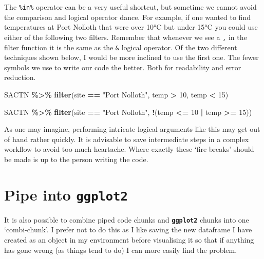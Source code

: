 \documentclass[
]{book}
\newenvironment{Shaded}{\begin{snugshade}}{\end{snugshade}}
\newcommand{\DecValTok}[1]{\textcolor[rgb]{0.00,0.00,0.81}{#1}}
\newcommand{\KeywordTok}[1]{\textcolor[rgb]{0.13,0.29,0.53}{\textbf{#1}}}
\newcommand{\NormalTok}[1]{#1}
\newcommand{\OperatorTok}[1]{\textcolor[rgb]{0.81,0.36,0.00}{\textbf{#1}}}
\newcommand{\StringTok}[1]{\textcolor[rgb]{0.31,0.60,0.02}{#1}}
\begin{document}
The \texttt{\%in\%} operator can be a very useful shortcut, but sometime we cannot avoid the comparison and logical operator dance. For example, if one wanted to find temperatures at Port Nolloth that were over 10°C but under 15°C you could use either of the following two filters. Remember that whenever we see a \texttt{,} in the filter function it is the same as the \texttt{\&} logical operator. Of the two different techniques shown below, I would be more inclined to use the first one. The fewer symbols we use to write our code the better. Both for readability and error reduction.

\begin{Shaded}
\begin{Highlighting}[]
\NormalTok{SACTN }\OperatorTok{\%>\%}\StringTok{ }
\StringTok{  }\KeywordTok{filter}\NormalTok{(site }\OperatorTok{==}\StringTok{ "Port Nolloth"}\NormalTok{, temp }\OperatorTok{>}\StringTok{ }\DecValTok{10}\NormalTok{, temp }\OperatorTok{<}\StringTok{ }\DecValTok{15}\NormalTok{)}

\NormalTok{SACTN }\OperatorTok{\%>\%}\StringTok{ }
\StringTok{  }\KeywordTok{filter}\NormalTok{(site }\OperatorTok{==}\StringTok{ "Port Nolloth"}\NormalTok{, }\OperatorTok{!}\NormalTok{(temp }\OperatorTok{<=}\StringTok{ }\DecValTok{10} \OperatorTok{|}\StringTok{ }\NormalTok{temp  }\OperatorTok{>=}\StringTok{ }\DecValTok{15}\NormalTok{))}
\end{Highlighting}
\end{Shaded}

As one may imagine, performing intricate logical arguments like this may get out of hand rather quickly. It is advisable to save intermediate steps in a complex workflow to avoid too much heartache. Where exactly these `fire breaks' should be made is up to the person writing the code.

\hypertarget{pipe-into-ggplot2}{%
\section{\texorpdfstring{Pipe into \textbf{\texttt{ggplot2}}}{Pipe into ggplot2}}\label{pipe-into-ggplot2}}

It is also possible to combine piped code chunks and \textbf{\texttt{ggplot2}} chunks into one `combi-chunk'. I prefer not to do this as I like saving the new dataframe I have created as an object in my environment before visualising it so that if anything has gone wrong (as things tend to do) I can more easily find the problem.
\end{document}
